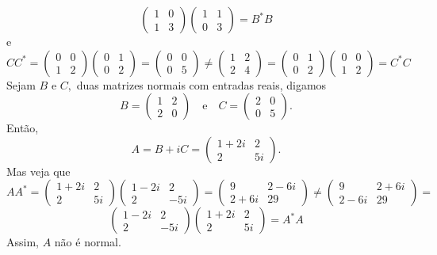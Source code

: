\documentclass[11pt,a4paper]{article}
\begin{document}
{{\[\begin{pmatrix}
1 & 0 \\
1 & 3
\end{pmatrix}\begin{pmatrix} 
1 & 1 \\
0 & 3
\end{pmatrix}= B^{*}B
\]
e
\[
CC^{*} = \left(\begin{matrix}
0 & 0 \\
1 & 2
\end{matrix}\right)\left(\begin{matrix}
0 & 1 \\
0 & 2
\end{matrix}\right) = \left(\begin{matrix}
0 & 0 \\
0 & 5
\end{matrix}\right) \neq  \left(\begin{matrix}
1 & 2 \\
2 & 4
\end{matrix}\right) =
\left(\begin{matrix}
0 & 1 \\
0 & 2
\end{matrix}\right) \left(\begin{matrix}
0 & 0 \\
1 & 2
\end{matrix}\right) = C^{*}C
\]
\task[\pers{d}] Sejam $B$ e $C,$ duas matrizes normais com entradas reais, digamos
\[
B = \begin{pmatrix}
1 & 2 \\
2 & 0
\end{pmatrix} \quad \mbox{e} \quad C = \begin{pmatrix}
2 & 0 \\
0 & 5
\end{pmatrix}.
\]
Então,
\[
A = B + iC = \begin{pmatrix}
1+2i & 2 \\
2 & 5i
\end{pmatrix}.
\]
Mas veja que
\[
AA^{*} = \begin{pmatrix}
1+2i & 2 \\
2 & 5i
\end{pmatrix}\begin{pmatrix}
1-2i & 2 \\
2 & -5i
\end{pmatrix} = \left(\begin{matrix}
9 & 2-6i \\
2+6i & 29
\end{matrix}\right) \neq \left(\begin{matrix}
9 & 2+6i \\
2-6i & 29
\end{matrix}\right) = \]\[\begin{pmatrix}
1-2i & 2 \\
2 & -5i
\end{pmatrix}\begin{pmatrix}
1+2i & 2 \\
2 & 5i
\end{pmatrix} = A^{*}A
\]
Assim, $A$ não é normal.

}}
\end{document}
